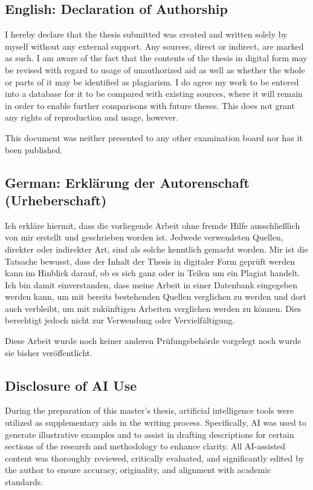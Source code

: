 \documentclass[a4paper,11pt,oneside]{article}
\begin{document}
\subsection*{English: Declaration of Authorship}

I hereby declare that the thesis submitted was created and written
solely by myself without any external support. Any sources, direct
or indirect, are marked as such. I am aware of the fact that the
contents of the thesis in digital form may be revised with regard to
usage of unauthorized aid as well as whether the whole or parts of
it may be identified as plagiarism. I do agree my work to be entered
into a database for it to be compared with existing sources, where
it will remain in order to enable further comparisons with future
theses. This does not grant any rights of reproduction and usage,
however.

This document was neither presented to any other examination board
nor has it been published.

\subsection*{German: Erklärung der Autorenschaft (Urheberschaft)}

Ich erkläre hiermit, dass die vorliegende Arbeit ohne fremde Hilfe
ausschließlich von mir erstellt und geschrieben worden ist. Jedwede
verwendeten Quellen, direkter oder indirekter Art, sind als solche
kenntlich gemacht worden. Mir ist die Tatsache bewusst, dass der
Inhalt der Thesis in digitaler Form geprüft werden kann im Hinblick
darauf, ob es sich ganz oder in Teilen um ein Plagiat handelt. Ich
bin damit einverstanden, dass meine Arbeit in einer Datenbank
eingegeben werden kann, um mit bereits bestehenden Quellen
verglichen zu werden und dort auch verbleibt, um mit zukünftigen
Arbeiten verglichen werden zu können. Dies berechtigt jedoch nicht
zur Verwendung oder Vervielfältigung.

Diese Arbeit wurde noch keiner anderen Prüfungsbehörde vorgelegt
noch wurde sie bisher veröffentlicht.

\subsection*{Disclosure of AI Use}
During the preparation of this master's thesis, artificial intelligence tools were utilized as
supplementary aids in the writing process. Specifically, AI was used to generate illustrative
examples and to assist in drafting descriptions for certain sections of the research and
methodology to enhance clarity. All AI-assisted content was thoroughly reviewed, critically
evaluated, and significantly edited by the author to ensure accuracy, originality, and alignment
with academic standards.
\end{document}
